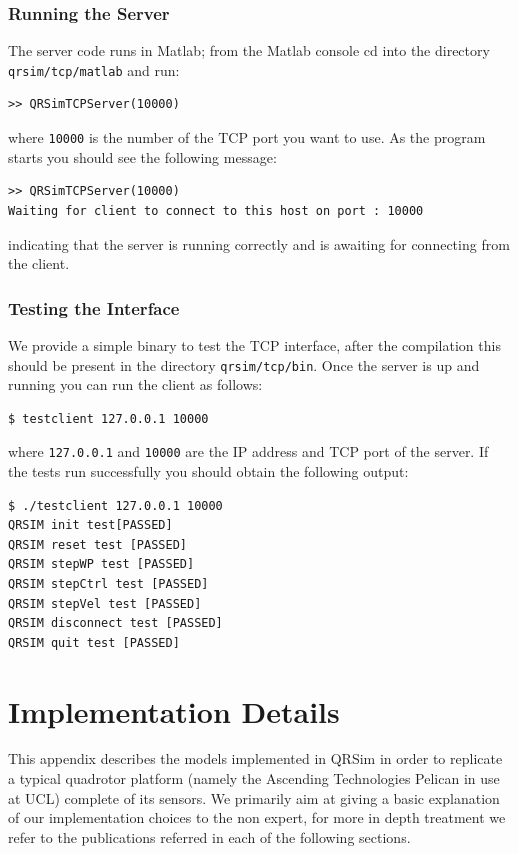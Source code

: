 \documentclass[a4paper,11pt]{report}
\newcommand{\sname}{QRSim\xspace}
\begin{document}
\subsection{Running the Server}\label{run}
The server code runs in Matlab; from the Matlab console cd into the directory \texttt{qrsim/tcp/matlab} and run:
\begin{verbatim}
>> QRSimTCPServer(10000)
\end{verbatim}
where \texttt{10000} is the number of the TCP port you want to use. As the program starts you should see the following message:
\begin{verbatim}
>> QRSimTCPServer(10000)
Waiting for client to connect to this host on port : 10000
\end{verbatim}
indicating that the server is running correctly and is awaiting for connecting from the client.

\subsection{Testing the Interface}

We provide a simple binary to test the TCP interface, after the compilation this should be present in the directory \texttt{qrsim/tcp/bin}.
Once the server is up and running you can run the client as follows:
\begin{verbatim}
$ testclient 127.0.0.1 10000
\end{verbatim}
where \texttt{127.0.0.1} and \texttt{10000} are the IP address and TCP port of the server.
If the tests run successfully you should obtain the following output:
\begin{verbatim}
$ ./testclient 127.0.0.1 10000
QRSIM init test[PASSED]
QRSIM reset test [PASSED]
QRSIM stepWP test [PASSED]
QRSIM stepCtrl test [PASSED]
QRSIM stepVel test [PASSED]
QRSIM disconnect test [PASSED]
QRSIM quit test [PASSED]
\end{verbatim}



\appendix
\chapter{Implementation Details}

This appendix describes the models implemented in \sname in order to replicate a typical quadrotor platform (namely the Ascending Technologies Pelican \cite{asctec2011pelican} in use at UCL) complete of its sensors.
We primarily aim at giving a basic explanation of our implementation choices to the non expert, for more in depth treatment we refer to the publications referred in each of the following sections.
\end{document}
